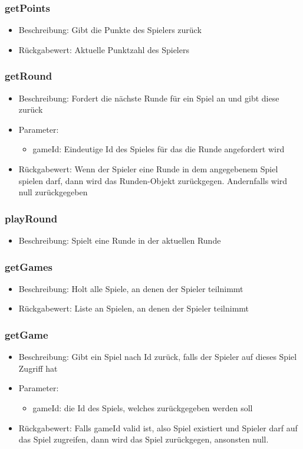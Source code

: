 \documentclass[a4paper]{scrreprt}
\begin{document}
	\subsubsection{getPoints}
	\begin{itemize}
		\item Beschreibung: Gibt die Punkte des Spielers zurück
		\item Rückgabewert: Aktuelle Punktzahl des Spielers 
	\end{itemize}
	\subsubsection{getRound}
	\begin{itemize}
		\item Beschreibung: Fordert die nächste Runde für ein Spiel an und gibt diese zurück
		\item Parameter:
		\begin{itemize}
			\item gameId: Eindeutige Id des Spieles für das die Runde angefordert wird
		\end{itemize}
		\item Rückgabewert: Wenn der Spieler eine Runde in dem angegebenem Spiel spielen darf, dann wird das Runden-Objekt zurückgegen. Andernfalls wird null zurückgegeben 
	\end{itemize}
	\subsubsection{playRound}
	\begin{itemize}
		\item Beschreibung: Spielt eine Runde in der aktuellen Runde
	\end{itemize}
	\subsubsection{getGames}
	\begin{itemize}
		\item Beschreibung: Holt alle Spiele, an denen der Spieler teilnimmt
		\item Rückgabewert: Liste an Spielen, an denen der Spieler teilnimmt 
	\end{itemize}
	\subsubsection{getGame}
	\begin{itemize}
		\item Beschreibung: Gibt ein Spiel nach Id zurück, falls der Spieler auf dieses Spiel Zugriff hat
		\item Parameter:
		\begin{itemize}
			\item gameId: die Id des Spiels, welches zurückgegeben werden soll
		\end{itemize}
		\item Rückgabewert: Falls gameId valid ist, also Spiel existiert und Spieler darf auf das Spiel zugreifen, dann wird das Spiel zurückgegen, ansonsten null. 
	\end{itemize}
\end{document}

